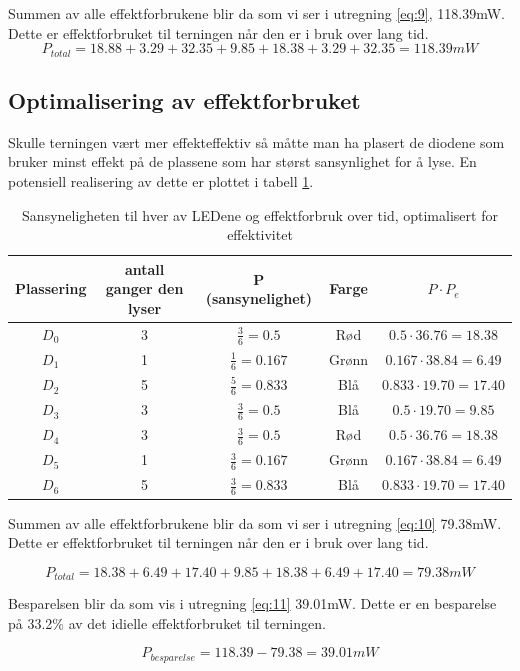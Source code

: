 Summen av alle effektforbrukene blir da som vi ser i utregning \ref{eq:9}, 118.39mW. Dette er effektforbruket til terningen når den er i bruk over lang tid.
\begin{equation}
  P_{total} = 18.88 + 3.29 + 32.35 + 9.85 + 18.38 + 3.29 + 32.35 = 118.39 mW
  \label{eq:9}
\end{equation}



\subsection[Optimalisering]{Optimalisering av effektforbruket}

Skulle terningen vært mer effekteffektiv så måtte man ha plasert de diodene som bruker minst effekt på de plassene som har størst sansynlighet for å lyse. En potensiell realisering av dette er plottet i tabell \ref{table:tab5}.

\begin{table}[!h]
  \centering
  \caption{Sansyneligheten til hver av LEDene og effektforbruk over tid, optimalisert for effektivitet}
  \begin{tabular}[!h]{ |c|c|c|c|c| }
    \hline
    Plassering & antall ganger den lyser & P (sansynelighet) & Farge & $P \cdot P_e $  \\
    \hline
    $D_0$ & 3 & $\frac{3}{6} = 0.5$ & Rød & $0.5 \cdot 36.76 = 18.38$\\
    \hline
    $D_1$ & 1 & $\frac{1}{6} = 0.167$ & Grønn & $0.167 \cdot 38.84 = 6.49$\\
    \hline
    $D_2$ & 5 & $\frac{5}{6} = 0.833$ & Blå & $0.833 \cdot 19.70 = 17.40$\\
    \hline
    $D_3$ & 3 & $\frac{3}{6} = 0.5$ & Blå & $0.5 \cdot 19.70 = 9.85$\\
    \hline
    $D_4$ & 3 & $\frac{3}{6} = 0.5$ & Rød & $0.5 \cdot 36.76 = 18.38$\\
    \hline
    $D_5$ & 1 & $\frac{3}{6} = 0.167$ & Grønn & $0.167 \cdot 38.84 = 6.49$\\
    \hline
    $D_6$ & 5 & $\frac{3}{6} = 0.833$ & Blå & $0.833 \cdot 19.70 = 17.40$\\
    \hline
  \end{tabular}
  \label{table:tab5}
\end{table}

Summen av alle effektforbrukene blir da som vi ser i utregning \ref{eq:10} 79.38mW. Dette er effektforbruket til terningen når den er i bruk over lang tid.

\begin{equation}
  P_{total} = 18.38 + 6.49 + 17.40 + 9.85 + 18.38 + 6.49 + 17.40 = 79.38 mW
  \label{eq:10}
\end{equation}

Besparelsen blir da som vis i utregning \ref{eq:11} 39.01mW. Dette er en besparelse på 33.2\% av det idielle effektforbruket til terningen.

\begin{equation}
  P_{besparelse} = 118.39 - 79.38 = 39.01 mW
  \label{eq:11}
\end{equation}

